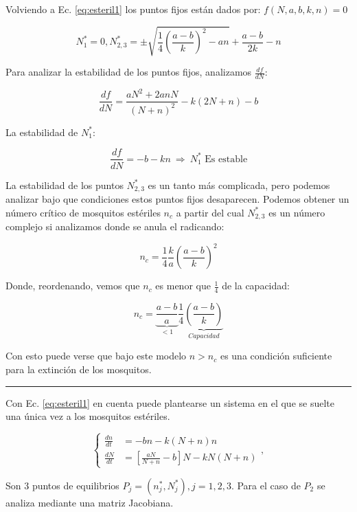 \documentclass[twocolumn,aps,prl]{revtex4-1}
\newcommand{\nstar}{n^*}
\newcommand{\Nstar}{N^*}
\newcommand*\sepline{%
  \begin{center}
    \rule[1ex]{.5\textwidth}{.5pt}
  \end{center}}
\begin{document}
Volviendo a Ec. \ref{eq:esteril1} los puntos fijos están dados por: $f(N,a,b,k,n) = 0$

$$
\Nstar_1 = 0, 
\Nstar_{2,3} = \pm 
\sqrt{
    \frac{1}{4} \left( \frac{a-b}{k} \right)^2 - a n 
    }
+ \frac{a-b}{2k} 
- n
$$

Para analizar la estabilidad de los puntos fijos, analizamos $\frac{d f}{d N}$:

$$
\frac{d f}{d N} = \frac{ aN^2 + 2 a n N}{( N + n )^2}
- k (2N + n) - b 
$$

La estabilidad de $\Nstar_1$:

$$
\frac{d f}{d N} = - b - k  n  
\ \Rightarrow  \ 
\Nstar_1 \text{  Es estable}
$$

La estabilidad de los puntos $\Nstar_{2,3}$ es un tanto más complicada, pero podemos analizar bajo que condiciones estos puntos fijos desaparecen. Podemos obtener un número crítico de mosquitos estériles $n_c$ a partir del cual $\Nstar_{2,3}$ es un número complejo si analizamos donde se anula el radicando:

$$
n_c =  
\frac{1}{4} 
\frac{k}{a} 
\left( \frac{a-b}{k} \right)^2
$$

Donde, reordenando, vemos que $n_c$ es menor que $ \frac{1}{4} $ de la capacidad:

$$
n_c =  
\underbrace{\frac{a-b}{a} }_{<1}
\frac{1}{4} 
\underbrace{\left( \frac{a-b}{k} \right)}_{Capacidad }
$$

Con esto puede verse que bajo este modelo $n > n_c$ es una condición suficiente para la extinción de los mosquitos.

\sepline

Con Ec. \ref{eq:esteril1} en cuenta puede plantearse un sistema en el que se suelte una única vez a los mosquitos estériles.

\begin{equation}
    \left\lbrace
    \begin{aligned}
        \frac{d n}{d t}&=  -b n - k (N+n) n \\
        \frac{d N}{d t}&=\left[\frac{a N}{N+n}-b\right] N- k N(N+n)
    \end{aligned}
    \right. ,
\end{equation}

Son 3 puntos de equilibrios $P_j = (\nstar_{j},\Nstar_{j}), j= 1, 2, 3$. Para el caso de $P_2$ se analiza mediante una matriz Jacobiana.
\end{document}
